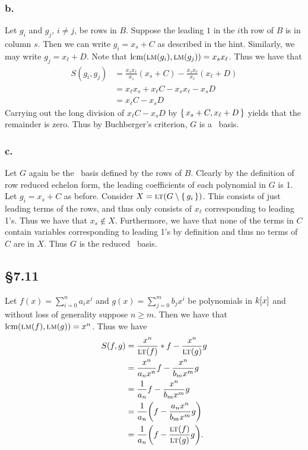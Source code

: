 \documentclass[letterpaper]{article}
\begin{document}
\clearpage

\subsubsection*{b.}

Let $g_{i}$ and $g_{j}$, $i \neq j$, be rows in $B$. Suppose the leading $1$ in the $i$th row of $B$ is in column $s$. Then we can write $g_{i} = x_{s} + C$ as described in the hint. Similarly, we may write $g_{j} = x_{\ell} + D$. Note that $\operatorname{lcm}(\operatorname{\textsc{lm}}(g_{i}), \operatorname{\textsc{lm}}(g_{j})) = x_{s}x_{\ell}$. Thus we have that
\begin{align*}
  S(g_{i}, g_{j}) &= \frac{x_{s} x_{\ell}}{x_{s}}(x_{s} + C) - \frac{x_{s} x_{\ell}}{x_{\ell}} (x_{\ell} + D) \\
                  &= x_{\ell}x_{s} + x_{\ell} C - x_{s} x_{\ell} - x_{s} D \\
                  &= x_{\ell} C - x_{s} D
\end{align*}
Carrying out the long division of $x_{\ell} C - x_{s} D$ by $\set{x_{s} + C, x_{\ell} + D}$ yields that the remainder is zero. Thus by Buchberger's criterion, $G$ is a \Grobner\ basis.

\subsubsection*{c.}

Let $G$ again be the \Grobner\ basis defined by the rows of $B$. Clearly by the definition of row reduced echelon form, the leading coefficients of each polynomial in $G$ is 1. Let $g_{i} = x_{s} + C$ as before. Consider $X = \gen{\lt(G \setminus \set{g_{i}})}$. This consists of just leading terms of the rows, and thus only consists of $x_{\ell}$ corresponding to leading 1's. Thus we have that $x_{s} \notin X$. Furthermore, we have that none of the terms in $C$ contain variables corresponding to leading 1's by definition and thus no terms of $C$ are in $X$. Thus $G$ is the reduced \Grobner\ basis.

\subsection*{\S 7.11}

Let $f(x) = \sum_{i = 0}^{n} a_{i}x^{i}$ and $g(x) = \sum_{j = 0}^{m} b_{j} x^{i}$ be polynomials in $k\bqty{x}$ and without loss of generality suppose $n \geq m$. Then we have that $\operatorname{lcm}(\operatorname{\textsc{lm}}(f), \operatorname{\textsc{lm}}(g)) = x^{n}$. Thus we have
\begin{align*}
  S(f, g) &= \frac{x^{n}}{\lt(f)} * f - \frac{x^{n}}{\lt(g)}g \\
          &= \frac{x^{n}}{a_{n}x^{n}} f - \frac{x^{n}}{b_{m}x^{m}}g \\
          &= \frac{1}{a_{n}}f - \frac{x^{n}}{b_{m}x^{m}}g \\
          &= \frac{1}{a_{n}}\pqty{f - \frac{a_{n}x^{n}}{b_{m}x^{m}}g} \\
          &= \frac{1}{a_{n}}\pqty{f - \frac{\lt(f)}{\lt(g)}g}.
\end{align*}
\end{document}

